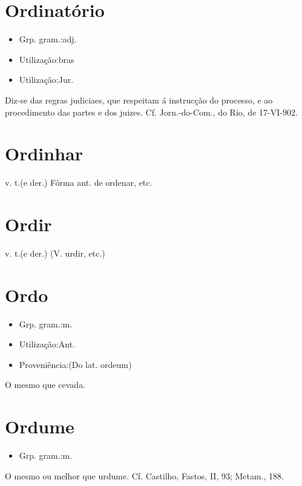 \section{Ordinatório}
\begin{itemize}
\item {Grp. gram.:adj.}
\end{itemize}
\begin{itemize}
\item {Utilização:bras}
\end{itemize}
\begin{itemize}
\item {Utilização:Jur.}
\end{itemize}
Diz-se das regras judiciaes, que respeitam á instrucção do processo, e ao procedimento das partes e dos juizes. Cf. \textunderscore Jorn.-do-Com.\textunderscore , do Rio, de 17-VI-902.
\section{Ordinhar}
\textunderscore v. t.\textunderscore  (e der.)
Fórma ant. de \textunderscore ordenar\textunderscore , etc.
\section{Ordir}
\textunderscore v. t.\textunderscore  (e der.)
(V. \textunderscore urdir\textunderscore , etc.)
\section{Ordo}
\begin{itemize}
\item {Grp. gram.:m.}
\end{itemize}
\begin{itemize}
\item {Utilização:Ant.}
\end{itemize}
\begin{itemize}
\item {Proveniência:(Do lat. \textunderscore ordeum\textunderscore )}
\end{itemize}
O mesmo que \textunderscore cevada\textunderscore .
\section{Ordume}
\begin{itemize}
\item {Grp. gram.:m.}
\end{itemize}
O mesmo ou melhor que \textunderscore urdume\textunderscore . Cf. Castilho, \textunderscore Fastos\textunderscore , II, 93; \textunderscore Metam.\textunderscore , 188.
